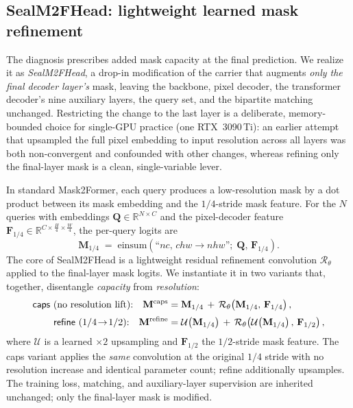 \subsection{SealM2FHead: lightweight learned mask refinement}
\label{sec:sealm2f}
The diagnosis prescribes added mask capacity at the final prediction. We realize it as \emph{SealM2FHead}, a drop-in modification of the carrier that augments \emph{only the final decoder layer's} mask, leaving the backbone, pixel decoder, the transformer decoder's nine auxiliary layers, the query set, and the bipartite matching unchanged. Restricting the change to the last layer is a deliberate, memory-bounded choice for single-GPU practice (one RTX~3090\,Ti): an earlier attempt that upsampled the full pixel embedding to input resolution across all layers was both non-convergent and confounded with other changes, whereas refining only the final-layer mask is a clean, single-variable lever.

In standard Mask2Former, each query produces a low-resolution mask by a dot product between its mask embedding and the $1/4$-stride mask feature. For the $N$ queries with embeddings $\mathbf{Q}\in\mathbb{R}^{N\times C}$ and the pixel-decoder feature $\mathbf{F}_{1/4}\in\mathbb{R}^{C\times \frac{H}{4}\times \frac{W}{4}}$, the per-query logits are
\begin{equation}
\mathbf{M}_{1/4} \;=\; \mathrm{einsum}\!\left(\text{``}nc,\,chw \rightarrow nhw\text{''};\; \mathbf{Q},\, \mathbf{F}_{1/4}\right).
\label{eq:m2f-dot}
\end{equation}
The core of SealM2FHead is a lightweight residual refinement convolution $\mathcal{R}_{\theta}$ applied to the final-layer mask logits. We instantiate it in two variants that, together, disentangle \emph{capacity} from \emph{resolution}:
\begin{align}
\text{\textsf{caps} (no resolution lift):}\quad
\mathbf{M}^{\mathrm{caps}} &= \mathbf{M}_{1/4} \,+\, \mathcal{R}_{\theta}\!\left(\mathbf{M}_{1/4},\, \mathbf{F}_{1/4}\right),
\label{eq:caps}\\[2pt]
\text{\textsf{refine} ($1/4\!\rightarrow\!1/2$):}\quad
\mathbf{M}^{\mathrm{refine}} &= \mathcal{U}\!\left(\mathbf{M}_{1/4}\right) \,+\, \mathcal{R}_{\theta}\!\left(\mathcal{U}\!\left(\mathbf{M}_{1/4}\right),\, \mathbf{F}_{1/2}\right),
\label{eq:refine}
\end{align}
where $\mathcal{U}$ is a learned $\times2$ upsampling and $\mathbf{F}_{1/2}$ the $1/2$-stride mask feature. The \textsf{caps} variant applies the \emph{same} convolution at the original $1/4$ stride with no resolution increase and identical parameter count; \textsf{refine} additionally upsamples. The training loss, matching, and auxiliary-layer supervision are inherited unchanged; only the final-layer mask is modified.

